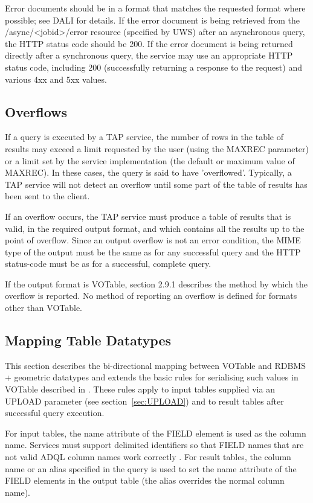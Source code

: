 \documentclass[11pt,letter]{ivoa}
\begin{document}
Error documents should be in a format that matches the requested
format where possible; see DALI \citep{std:DALI} for details. 
If the error document is being retrieved 
from the /async/<jobid>/error resource (specified by UWS) after an asynchronous 
query, the HTTP status code should be 200. If the error document is being 
returned directly after a synchronous query, the service may use an appropriate 
HTTP status code, including 200 (successfully returning a response to the 
request) and various 4xx and 5xx values.

\subsection{Overflows}
\label{sec:query-overflow}

If a query is executed by a TAP service, the number of rows in the table of 
results may exceed a limit requested by the user (using the MAXREC parameter) 
or a limit set by the service implementation (the default or maximum value of 
MAXREC). In these cases, the query is said to have 'overflowed'. Typically, a 
TAP service will not detect an overflow until some part of the table of results 
has been sent to the client.

If an overflow occurs, the TAP service must produce a table of results that is 
valid, in the required output format, and which contains all the results up to 
the point of overflow. Since an output overflow is not an error condition, the 
MIME type of the output must be the same as for any successful query and the 
HTTP status-code must be as for a successful, complete query.

If the output format is VOTable, section 2.9.1 describes the method by which 
the overflow is reported. No method of reporting an overflow is defined for 
formats other than VOTable.

\subsection{Mapping Table Datatypes}
\label{sec:vot-rdbms}

This section describes the bi-directional mapping between VOTable and RDBMS + 
geometric datatypes and extends the basic rules for serialising such values in 
VOTable described in \citep{std:DALI}. These rules apply to input tables 
supplied via an UPLOAD parameter (see section~\ref{sec:UPLOAD}) and to result tables after successful 
query execution.

For input tables, the name attribute of the FIELD element is used as the column 
name. Services must support delimited identifiers so that 
FIELD names that are not valid ADQL column names work correctly  
\citep{std:ADQL}. 
For result tables, the column name or an alias specified in the query is used 
to set the name attribute of the FIELD elements in the output table (the alias 
overrides the normal column name). 
\end{document}
